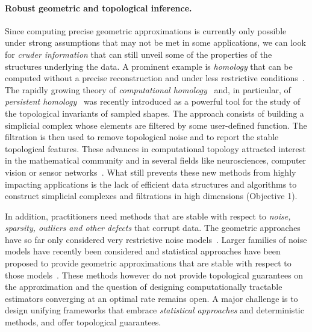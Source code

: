 \paragraph{Robust geometric and topological inference.}
Since computing precise geometric approximations is currently only possible under strong assumptions that may not be met in some applications, we can look for {\em cruder information }
that can still  unveil some of the properties of the structures underlying the data.
%
%
A prominent example is {\em homology} that can be computed without a precise reconstruction and under less restrictive conditions~\cite{geometrica-ccl09,nsw-fhm-2008}. The rapidly growing theory of {\em computational homology}~\cite{kmm-ch-2003} and, in particular, of {\em persistent homology}~\cite{hh-ct-2010,rg-bptd-2008,az-tfc-2009} was recently introduced as a powerful tool for the study of the topological invariants of sampled shapes. The approach consists of building a simplicial complex whose elements are filtered by some user-defined function. The filtration is then used to remove topological noise and to report the stable topological features.  These advances in computational topology attracted interest in the mathematical community and in several fields like neurosciences, computer vision or sensor networks~\cite{fpgo-airc-2009,cids-lbsni-2008,dsrg-csnph-2007}.  What still prevents these new methods from highly impacting applications is the lack of efficient data structures and algorithms to construct simplicial complexes and filtrations in high dimensions (Objective 1).

In addition, practitioners need methods that are stable with respect
to {\em noise, sparsity, outliers and other defects} that corrupt data. The geometric approaches have so far only considered very restrictive noise models~\cite{nsw-fhm-2008}.  Larger families of noise models have recently been considered and statistical approaches have been proposed to provide geometric approximations that are stable with respect to those models~\cite{gpvw-mme-2011}. These methods however do not provide topological guarantees on the approximation and the question of designing computationally tractable estimators converging at an optimal rate remains open. A major challenge is to design unifying frameworks that embrace {\em statistical approaches} and deterministic methods, and offer topological guarantees.  

